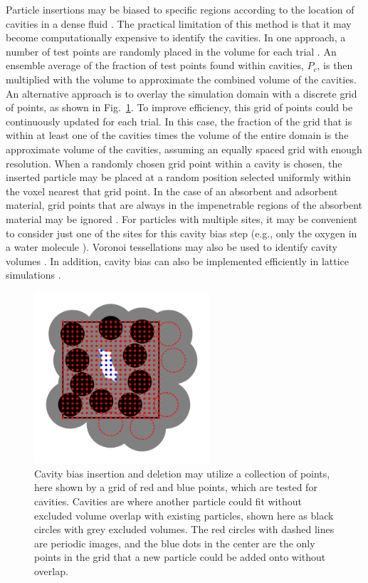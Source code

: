 \documentclass[
  9pt,
  bestpractices,
]{livecoms}
\begin{document}
Particle insertions may be biased to specific regions according to the location of cavities in a dense fluid \cite{mezei_cavity-biased_1980, mezei_grand-canonical_1987, snurr_prediction_1993, ikeda_generalization_2024}.
The practical limitation of this method is that it may become computationally expensive to identify the cavities.
In one approach, a number of test points are randomly placed in the volume for each trial \cite{mezei_cavity-biased_1980, mezei_grand-canonical_1987, snurr_prediction_1993}.
An ensemble average of the fraction of test points found within cavities, $P_c$, is then multiplied with the volume to approximate the combined volume of the cavities.
An alternative approach is to overlay the simulation domain with a discrete grid of points, as shown in Fig.~\ref{fig:cavity}.
To improve efficiency, this grid of points could be continuously updated for each trial.
In this case, the fraction of the grid that is within at least one of the cavities times the volume of the entire domain is the approximate volume of the cavities, assuming an equally spaced grid with enough resolution.
When a randomly chosen grid point within a cavity is chosen, the inserted particle may be placed at a random position selected uniformly within the voxel nearest that grid point.
In the case of an absorbent and adsorbent material, grid points that are always in the impenetrable regions of the absorbent material may be ignored \cite{snurr_prediction_1993}.
For particles with multiple sites, it may be convenient to consider just one of the sites for this cavity bias step (e.g., only the oxygen in a water molecule \cite{zhang_computational_2017}).
Voronoi tessellations may also be used to identify cavity volumes \cite{sastry_statistical_1997}.
In addition, cavity bias can also be implemented efficiently in lattice simulations \cite{barnes_structure_2009}.

\begin{figure}
\begin{centering}
\includegraphics[width=6.5cm]{../figures/cavity.pdf}
\caption{
Cavity bias insertion and deletion may utilize a collection of points, here shown by a grid of red and blue points, which are tested for cavities.
Cavities are where another particle could fit without excluded volume overlap with existing particles, shown here as black circles with grey excluded volumes.
The red circles with dashed lines are periodic images, and the blue dots in the center are the only points in the grid that a new particle could be added onto without overlap.
}
\label{fig:cavity}
\end{centering}
\end{figure}
\end{document}
